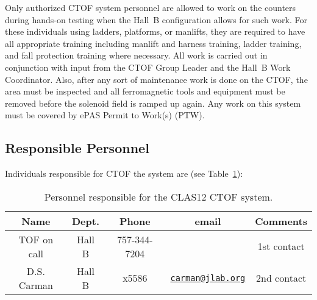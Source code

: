 Only authorized CTOF system personnel are allowed to work on the counters during hands-on
testing when the Hall~B configuration allows for such work. For these individuals using 
ladders, platforms, or manlifts, they are required to have all appropriate training 
including manlift and harness training, ladder training, and fall protection training where
necessary. All work is carried out in conjunction with input from the CTOF Group Leader and
the Hall~B Work Coordinator. Also, after any sort of maintenance 
work is done on the CTOF, the area must be inspected and all ferromagnetic tools and 
equipment must be removed before the solenoid field is ramped up again. Any work on this system
must be covered by ePAS Permit to Work(s) (PTW).

\subsection{Responsible Personnel}

Individuals responsible for CTOF the system are (see Table~\ref{tb:ctof}):

\begin{table}[!htb]
\centering
\begin{tabular}{|c|c|c|c|c|} \hline
Name              & Dept.  & Phone        & email & Comments \\ \hline
TOF on call & Hall B & 757-344-7204 &       & 1st contact \\ \hline
D.S. Carman       & Hall B & x5586 & \href{mailto:carman@jlab.org}{\nolinkurl{carman@jlab.org}} & 2nd contact \\ \hline
\end{tabular}
\caption{Personnel responsible for the CLAS12 CTOF system.} 
\label{tb:ctof}
\end{table}

\vfil
\eject
